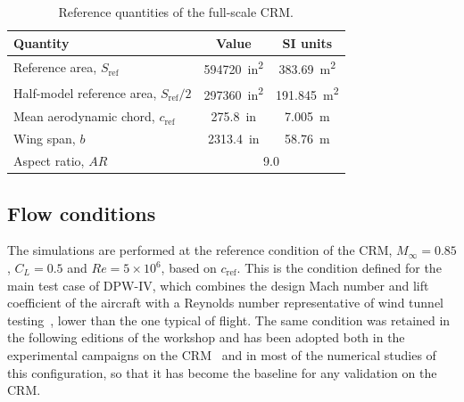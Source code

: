 \begin{table}[htbp]
  \centering
  \caption{Reference quantities of the full-scale CRM.}
  \label{tab:val_refquantities}
  \begin{tabular}{lcc}
    \hline
    Quantity & Value & SI units \\
    \hline
    Reference area, $S_\mathrm{ref}$ & \SI{594720}{in^2} & \SI{383.69}{m^2} \\
    Half-model reference area, $S_\mathrm{ref}/2$ & \SI{297360}{in^2} & \SI{191.845}{m^2} \\
    Mean aerodynamic chord, $c_\mathrm{ref}$ & \SI{275.8}{in} & \SI{7.005}{m} \\
    Wing span, $b$ & \SI{2313.4}{in} & \SI{58.76}{m} \\
    Aspect ratio, $AR$ & \multicolumn{2}{c}{9.0} \\
    \hline
  \end{tabular}
\end{table}

\subsection{Flow conditions}
\label{sec:val_flow}

The simulations are performed at the reference condition of the CRM, $M_\infty = 0.85$, $C_L = 0.5$ and $Re = 5\times10^{6}$, based on $c_\mathrm{ref}$. This is the condition defined for the main test case of DPW-IV, which combines the design Mach number and lift coefficient of the aircraft with a Reynolds number representative of wind tunnel testing~\cite{vassberg2010}, lower than the one typical of flight. The same condition was retained in the following editions of the workshop and has been adopted both in the experimental campaigns on the CRM~\cite{rivers2015} and in most of the numerical studies of this configuration, so that it has become the baseline for any validation on the CRM.

